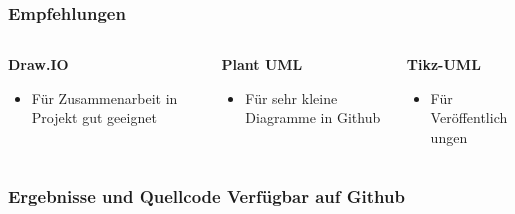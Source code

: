 \documentclass[xcolor=dvipsnames]{beamer}
\begin{document}
\begin{frame}
	
	
\end{frame}


\begin{frame}
	\frametitle{Empfehlungen}
	\begin{columns}
		
		
		\begin{column}{0.33\textwidth}
			\begin{block}{\textbf{Draw.IO}}
				\begin{itemize}
					\item Für Zusammenarbeit in Projekt gut geeignet
				\end{itemize}
			\end{block}
		\end{column}
		
		\begin{column}{0.4\textwidth}
			\begin{block}{\textbf{Plant UML}}
				\begin{itemize}
					\item Für sehr kleine Diagramme in Github
				\end{itemize}
			\end{block}
		\end{column}
		
		\begin{column}{0.33\textwidth}
			\begin{block}{\textbf{Tikz-UML}}
				\begin{itemize}
					\item Für Veröffentlichungen
				\end{itemize}
			\end{block}
		\end{column}
		
	\end{columns}

\end{frame}


\begin{frame}
	\frametitle{Ergebnisse und Quellcode Verfügbar auf Github}
	
	
\end{frame}
	
	
\end{document}
